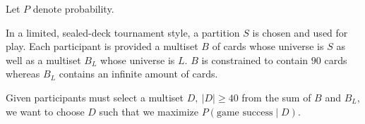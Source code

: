 \documentclass[12pt, letterpaper]{article}
\begin{document}
Let $ P $ denote probability.

In a limited, sealed-deck tournament style, a partition $ S $ is chosen and used for play.
Each participant is provided a multiset $ B $ of cards whose universe is $ S $
as well as a multiset $ B_L $ whose universe is $ L $.
$ B $ is constrained to contain $ 90 $ cards
whereas $ B_L $ contains an infinite amount of cards.

Given participants must select a multiset $ D, \ |D| \ge 40 $ from the sum of $ B $ and $ B_L $,
we want to choose $ D $ such that we maximize $ P(\text{game success} \mid D) $.
\end{document}
